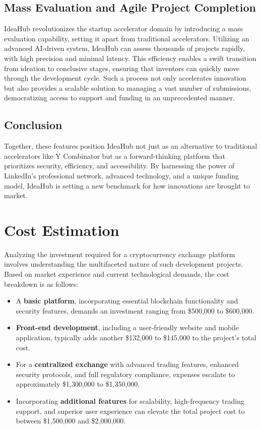 \documentclass{article}
\begin{document}
	\subsection{Mass Evaluation and Agile Project Completion}
	IdeaHub revolutionizes the startup accelerator domain by introducing a mass evaluation capability, setting it apart from traditional accelerators. Utilizing an advanced AI-driven system, IdeaHub can assess thousands of projects rapidly, with high precision and minimal latency. This efficiency enables a swift transition from ideation to conclusive stages, ensuring that inventors can quickly move through the development cycle. Such a process not only accelerates innovation but also provides a scalable solution to managing a vast number of submissions, democratizing access to support and funding in an unprecedented manner.
		
	\subsection{Conclusion}
	Together, these features position IdeaHub not just as an alternative to traditional accelerators like Y Combinator but as a forward-thinking platform that prioritizes security, efficiency, and accessibility. By harnessing the power of LinkedIn's professional network, advanced technology, and a unique funding model, IdeaHub is setting a new benchmark for how innovations are brought to market.
	
	
	
	\section{Cost Estimation}
	Analyzing the investment required for a cryptocurrency exchange platform involves understanding the multifaceted nature of such development projects. Based on market experience and current technological demands, the cost breakdown is as follows:
	
	\begin{itemize}
		\item A \textbf{basic platform}, incorporating essential blockchain functionality and security features, demands an investment ranging from \$500,000 to \$600,000.
		\item \textbf{Front-end development}, including a user-friendly website and mobile application, typically adds another \$132,000 to \$145,000 to the project's total cost.
		\item For a \textbf{centralized exchange} with advanced trading features, enhanced security protocols, and full regulatory compliance, expenses escalate to approximately \$1,300,000 to \$1,350,000.
		\item Incorporating \textbf{additional features} for scalability, high-frequency trading support, and superior user experience can elevate the total project cost to between \$1,500,000 and \$2,000,000.
	\end{itemize}
	
\end{document}
